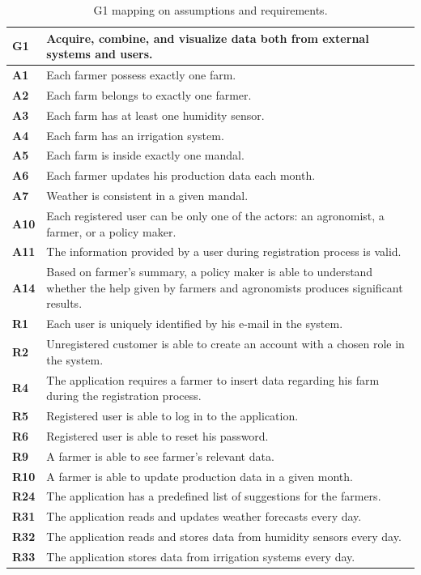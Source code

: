 \begin{table}[H]
    \centering
    \begin{tabularx}{\linewidth}{lX} \toprule
         \textbf{G1} & Acquire, combine, and visualize data both from external systems and users. \\ \midrule
         \textbf{A1} & Each farmer possess exactly one farm. \\
         \textbf{A2} & Each farm belongs to exactly one farmer. \\
         \textbf{A3} & Each farm has at least one humidity sensor. \\
         \textbf{A4} & Each farm has an irrigation system. \\
         \textbf{A5} & Each farm is inside exactly one mandal. \\
         \textbf{A6} & Each farmer updates his production data each month. \\
         \textbf{A7} & Weather is consistent in a given mandal.\\
         \textbf{A10} & Each registered user can be only one of the actors: an agronomist, a farmer, or a policy maker. \\
         \textbf{A11} & The information provided by a user during registration process is valid. \\
         \textbf{A14} & Based on farmer's summary, a policy maker is able to understand whether the help given by farmers and agronomists produces significant results.\\ 
         \midrule
         \textbf{R1} & Each user is uniquely identified by his e-mail in the system. \\
         \textbf{R2} & Unregistered customer is able to create an account with a chosen role in the system. \\
         \textbf{R4} &  The application requires a farmer to insert data regarding his farm during the registration process. \\
         \textbf{R5} & Registered user is able to log in to the application. \\
		 \textbf{R6} & Registered user is able to reset his password. \\
         \textbf{R9} & A farmer is able to see farmer's relevant data. \\
         \textbf{R10} & A farmer is able to update production data in a given month. \\
          \textbf{R24} & The application has a predefined list of suggestions for the farmers. \\
          \textbf{R31} & The application reads and updates  weather forecasts every day. \\
          \textbf{R32} & The application reads and stores  data from humidity sensors every day.  \\
          \textbf{R33} & The application stores data from irrigation systems every day. \\
         \bottomrule
    \end{tabularx}
    \caption{G1 mapping on assumptions and requirements.}
\end{table}

